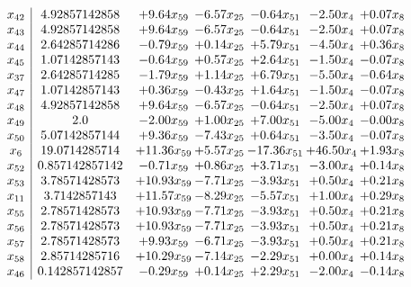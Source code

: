 \documentclass[8pt]{article}
\begin{document}
\[\begin{array}{c| c c@{\hskip 2pt} c@{\hskip 2pt} c@{\hskip 2pt} c@{\hskip 2pt} c@{\hskip 2pt} }
 x_{42}   &  4.92857142858 & +  9.64 x_{59} & -6.57 x_{25} & -0.64 x_{51} & -2.50 x_{4} & +  0.07 x_{8}\\
 x_{43}   &  4.92857142858 & +  9.64 x_{59} & -6.57 x_{25} & -0.64 x_{51} & -2.50 x_{4} & +  0.07 x_{8}\\
 x_{44}   &  2.64285714286 & -0.79 x_{59} & +  0.14 x_{25} & +  5.79 x_{51} & -4.50 x_{4} & +  0.36 x_{8}\\
 x_{45}   &  1.07142857143 & -0.64 x_{59} & +  0.57 x_{25} & +  2.64 x_{51} & -1.50 x_{4} & -0.07 x_{8}\\
 x_{37}   &  2.64285714285 & -1.79 x_{59} & +  1.14 x_{25} & +  6.79 x_{51} & -5.50 x_{4} & -0.64 x_{8}\\
 x_{47}   &  1.07142857143 & +  0.36 x_{59} & -0.43 x_{25} & +  1.64 x_{51} & -1.50 x_{4} & -0.07 x_{8}\\
 x_{48}   &  4.92857142858 & +  9.64 x_{59} & -6.57 x_{25} & -0.64 x_{51} & -2.50 x_{4} & +  0.07 x_{8}\\
 x_{49}   &  2.0 & -2.00 x_{59} & +  1.00 x_{25} & +  7.00 x_{51} & -5.00 x_{4} & -0.00 x_{8}\\
 x_{50}   &  5.07142857144 & +  9.36 x_{59} & -7.43 x_{25} & +  0.64 x_{51} & -3.50 x_{4} & -0.07 x_{8}\\
 x_{6}   &  19.0714285714 & + 11.36 x_{59} & +  5.57 x_{25} & -17.36 x_{51} & + 46.50 x_{4} & +  1.93 x_{8}\\
 x_{52}   &  0.857142857142 & -0.71 x_{59} & +  0.86 x_{25} & +  3.71 x_{51} & -3.00 x_{4} & +  0.14 x_{8}\\
 x_{53}   &  3.78571428573 & + 10.93 x_{59} & -7.71 x_{25} & -3.93 x_{51} & +  0.50 x_{4} & +  0.21 x_{8}\\
 x_{11}   &  3.7142857143 & + 11.57 x_{59} & -8.29 x_{25} & -5.57 x_{51} & +  1.00 x_{4} & +  0.29 x_{8}\\
 x_{55}   &  2.78571428573 & + 10.93 x_{59} & -7.71 x_{25} & -3.93 x_{51} & +  0.50 x_{4} & +  0.21 x_{8}\\
 x_{56}   &  2.78571428573 & + 10.93 x_{59} & -7.71 x_{25} & -3.93 x_{51} & +  0.50 x_{4} & +  0.21 x_{8}\\
 x_{57}   &  2.78571428573 & +  9.93 x_{59} & -6.71 x_{25} & -3.93 x_{51} & +  0.50 x_{4} & +  0.21 x_{8}\\
 x_{58}   &  2.85714285716 & + 10.29 x_{59} & -7.14 x_{25} & -2.29 x_{51} & +  0.00 x_{4} & +  0.14 x_{8}\\
 x_{46}   &  0.142857142857 & -0.29 x_{59} & +  0.14 x_{25} & +  2.29 x_{51} & -2.00 x_{4} & -0.14 x_{8}\\

\end{array}\]
\end{document}
